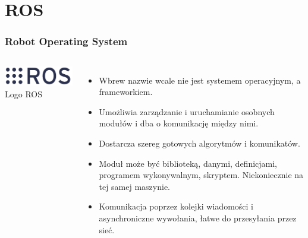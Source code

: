 \documentclass{beamer}
\begin{document}
	\section{ROS}
	\begin{frame}
		\frametitle{Robot Operating System}
		\begin{columns}[c]
			\includegraphics[width=\textwidth]{graphics/ros_logo.png} \\
			Logo ROS\footnotemark
			\begin{itemize}
				\item Wbrew nazwie wcale nie jest systemem operacyjnym, a frameworkiem.
				\item Umożliwia zarządzanie i uruchamianie osobnych modułów i dba o komunikację między nimi.
				\item Dostarcza szereg gotowych algorytmów i komunikatów.
				\item Moduł może być biblioteką, danymi, definicjami, programem wykonywalnym, skryptem. Niekoniecznie na tej samej maszynie.
				\item Komunikacja poprzez kolejki wiadomości i asynchroniczne wywołania, łatwe do przesyłania przez sieć.
			\end{itemize}
		\end{columns}
	\end{frame}
\end{document}
